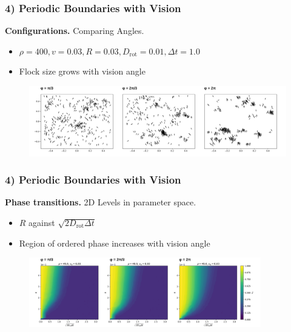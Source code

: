 \begin{frame}
	\frametitle{4) Periodic Boundaries with Vision}
	\textbf{Configurations.} Comparing Angles.
	\begin{itemize}
	    \item $\rho = 400, v = 0.03, R = 0.03, D_{\text{rot}} = 0.01, \Delta t = 1.0$
	    \item Flock size grows with vision angle
	\end{itemize}
	\begin{figure}[H]
  		\includegraphics[width=\textwidth]{images/chapter4/configuration_comp_N_20_L_1.000000_v_0.030000_R_0.030000_D_0.010000.png} 
	\end{figure}
\end{frame}

\begin{frame}
	\frametitle{4) Periodic Boundaries with Vision}
	\textbf{Phase transitions.} 2D Levels in parameter space.
	\begin{itemize}
	    \item $R$ against $\sqrt{2D_{\text{rot}}\Delta t}$
	    \item Region of ordered phase increases with vision angle
	\end{itemize}
	\begin{figure}[H]
  		\includegraphics[width=0.9\textwidth]{images/chapter4/phase_comp_N_20_L_1.000000_v_0.030000_R_0.030000_D_0.010000.png} 
	\end{figure}
\end{frame}




